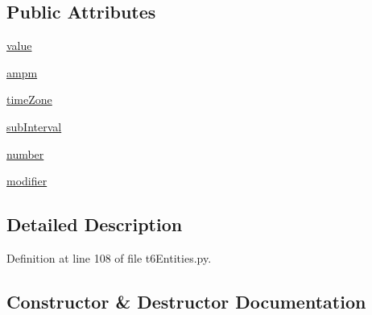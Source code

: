 \subsection*{Public Attributes}
\begin{DoxyCompactItemize}
\item 
\hyperlink{classtask6_1_1t6Entities_1_1t6HourOfDayEntity_af6e1bc0cd2063078c4908597b2832ae7}{value}
\item 
\hyperlink{classtask6_1_1t6Entities_1_1t6HourOfDayEntity_ad68268df88efcdec76d183c27cfa59e9}{ampm}
\item 
\hyperlink{classtask6_1_1t6Entities_1_1t6HourOfDayEntity_a6906b678bc646b94e4db2be21dbbff26}{time\+Zone}
\item 
\hyperlink{classtask6_1_1t6Entities_1_1t6HourOfDayEntity_a637145c887196acce3927eca32aeb576}{sub\+Interval}
\item 
\hyperlink{classtask6_1_1t6Entities_1_1t6HourOfDayEntity_a7ee6522e71827ca060e8ce642fc25733}{number}
\item 
\hyperlink{classtask6_1_1t6Entities_1_1t6HourOfDayEntity_a01b91998f5bf33c7abd6db7f8a5d1c73}{modifier}
\end{DoxyCompactItemize}


\subsection{Detailed Description}


Definition at line 108 of file t6\+Entities.\+py.



\subsection{Constructor \& Destructor Documentation}
\mbox{\label{classtask6_1_1t6Entities_1_1t6HourOfDayEntity_a9c28f38d34c703c758eafaae1fc14845}} 
